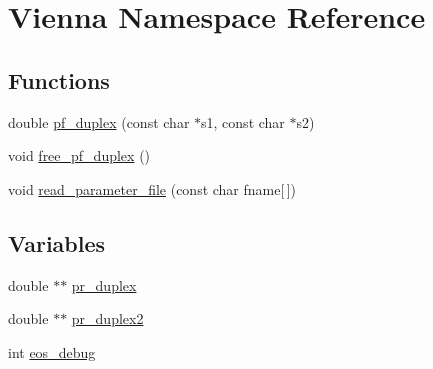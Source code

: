 \hypertarget{namespace_vienna}{\section{Vienna Namespace Reference}
\label{namespace_vienna}
}
\subsection*{Functions}
\begin{DoxyCompactItemize}
\item 
double \hyperlink{namespace_vienna_a98c60fd60f1a49c02e173894d267e9de}{pf\+\_\+duplex} (const char $\ast$s1, const char $\ast$s2)
\item 
void \hyperlink{namespace_vienna_a89cffb8532a093c741afe8d91c7fef58}{free\+\_\+pf\+\_\+duplex} ()
\item 
void \hyperlink{namespace_vienna_a3a7190f15cb9b57ffc30919582986631}{read\+\_\+parameter\+\_\+file} (const char fname\mbox{[}$\,$\mbox{]})
\end{DoxyCompactItemize}
\subsection*{Variables}
\begin{DoxyCompactItemize}
\item 
double $\ast$$\ast$ \hyperlink{namespace_vienna_a8238d1b2f4301ad0ed67a7e02c3bb4e3}{pr\+\_\+duplex}
\item 
double $\ast$$\ast$ \hyperlink{namespace_vienna_af212193cb67ebca5f87d42c4ab9e0196}{pr\+\_\+duplex2}
\item 
int \hyperlink{namespace_vienna_a24d3b842931ab2ed27b801a9ea14b77f}{eos\+\_\+debug}
\end{DoxyCompactItemize}


